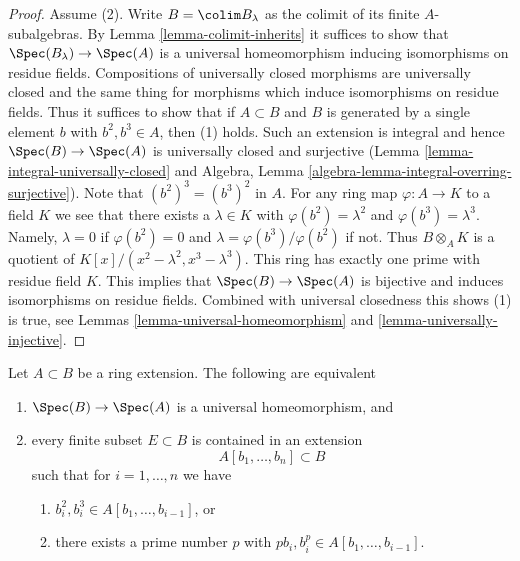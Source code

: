 \begin{proof}
\medskip\noindent
Assume (2). Write $B = \colim B_\lambda$ as the colimit of its
finite $A$-subalgebras.
By Lemma \ref{lemma-colimit-inherits} it suffices to show
that $\Spec(B_\lambda) \to \Spec(A)$ is a
universal homeomorphism inducing isomorphisms on residue fields.
Compositions of universally closed morphisms are universally closed
and the same thing for morphisms which induce isomorphisms on residue fields.
Thus it suffices to show that if $A \subset B$ and $B$ is generated
by a single element $b$ with $b^2, b^3 \in A$, then (1) holds.
Such an extension is integral and hence $\Spec(B) \to \Spec(A)$ is
universally closed and surjective
(Lemma \ref{lemma-integral-universally-closed} and
Algebra, Lemma \ref{algebra-lemma-integral-overring-surjective}).
Note that $(b^2)^3 = (b^3)^2$ in $A$.
For any ring map $\varphi : A \to K$ to a field $K$ we see that there
exists a $\lambda \in K$ with $\varphi(b^2) = \lambda^2$ and
$\varphi(b^3) = \lambda^3$. Namely, $\lambda = 0$ if $\varphi(b^2) = 0$
and $\lambda = \varphi(b^3)/\varphi(b^2)$ if not. Thus
$B \otimes_A K$ is a quotient of $K[x]/(x^2 - \lambda^2, x^3 - \lambda^3)$.
This ring has exactly one prime with residue field $K$.
This implies that $\Spec(B) \to \Spec(A)$ is bijective and induces
isomorphisms on residue fields. Combined with universal closedness
this shows (1) is true, see Lemmas \ref{lemma-universal-homeomorphism}
and \ref{lemma-universally-injective}.
\end{proof}

\begin{proposition}
\label{proposition-universal-homeomorphism}
Let $A \subset B$ be a ring extension. The following are equivalent
\begin{enumerate}
\item $\Spec(B) \to \Spec(A)$ is a universal homeomorphism, and
\item every finite subset $E \subset B$ is contained in an extension
$$
A[b_1, \ldots, b_n] \subset B
$$
such that for $i = 1, \ldots, n$ we have
\begin{enumerate}
\item $b_i^2, b_i^3 \in A[b_1, \ldots, b_{i - 1}]$, or
\item there exists a prime number $p$ with
$pb_i, b_i^p \in A[b_1, \ldots, b_{i - 1}]$.
\end{enumerate}
\end{enumerate}
\end{proposition}

